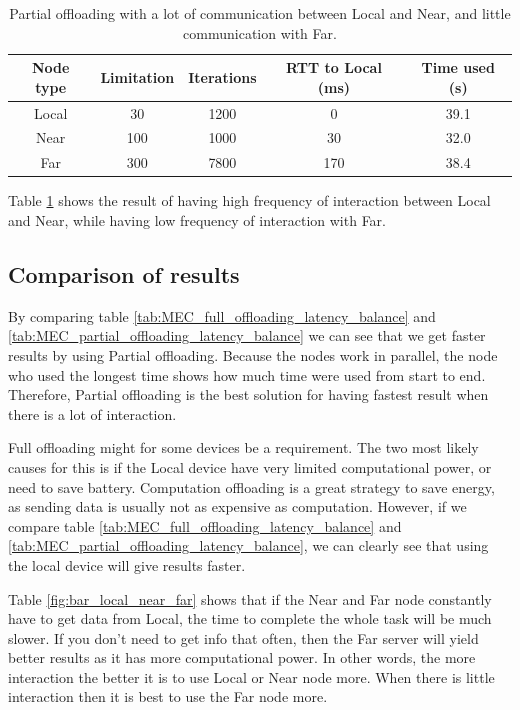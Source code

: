 \begin{table}[h!]
    \centering
    \begin{tabular}[c]{|c|c|c|c|c|}
        \hline
        Node type & Limitation & Iterations & RTT to Local (ms)& Time used (s)\\
        \hline
        \hline
        Local & 30 & 1200 & 0 & 39.1  \\
        \hline
        Near & 100 & 1000 & 30 & 32.0 \\
        \hline
        Far & 300 & 7800 & 170 & 38.4 \\
        \hline
    \end{tabular}
    \caption{Partial offloading with a lot of communication between Local and Near, and little communication with Far.}
    \label{tab:MEC_partial_offloading_little}
\end{table}

Table \ref{tab:MEC_partial_offloading_little} shows the result of having high frequency of interaction between Local and Near, while having low frequency of interaction with Far.



\subsection{Comparison of results} \label{subsection:MEC_comparison}%
By comparing table \ref{tab:MEC_full_offloading_latency_balance} and \ref{tab:MEC_partial_offloading_latency_balance} we can see that we get faster results by using Partial offloading. Because the nodes work in parallel, the node who used the longest time shows how much time were used from start to end. Therefore, Partial offloading is the best solution for having fastest result when there is a lot of interaction.


Full offloading might for some devices be a requirement. The two most likely causes for this is if the Local device have very limited computational power, or need to save battery. Computation offloading is a great strategy to save energy, as sending data is usually not as expensive as computation. However, if we compare table \ref{tab:MEC_full_offloading_latency_balance} and \ref{tab:MEC_partial_offloading_latency_balance}, we can clearly see that using the local device will give results faster.

Table \ref{fig:bar_local_near_far} shows that if the Near and Far node constantly have to get data from Local, the time to complete the whole task will be much slower. If you don't need to get info that often, then the Far server will yield better results as it has more computational power. In other words, the more interaction the better it is to use Local or Near node more. When there is little interaction then it is best to use the Far node more.


